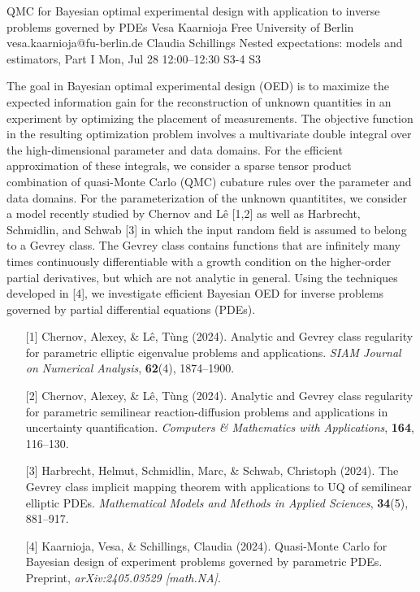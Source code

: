 \begin{talk}
  {QMC for Bayesian optimal experimental design with application to inverse problems governed by PDEs}%
  {Vesa Kaarnioja}%
  {Free University of Berlin}%
  {vesa.kaarnioja@fu-berlin.de}%
  {Claudia Schillings}%
  {Nested expectations: models and estimators, Part I}%
  {Mon, Jul 28 12:00–12:30}%
  {S3-4}%
  {S3}%
				
			
The goal in Bayesian optimal experimental design (OED) is to maximize the expected information gain for the reconstruction of unknown quantities in an experiment by optimizing the placement of measurements. The objective function in the resulting optimization problem involves a multivariate double integral over the high-dimensional parameter and data domains. For the efficient approximation of these integrals, we consider a sparse tensor product combination of quasi-Monte Carlo (QMC) cubature rules over the parameter and data domains. For the parameterization of the unknown quantitites, we consider a model recently studied by Chernov and L\^{e} [1,2] as well as Harbrecht, Schmidlin, and Schwab [3] in which the input random field is assumed to belong to a Gevrey class. The Gevrey class contains functions that are infinitely many times continuously differentiable with a growth condition on the higher-order partial derivatives, but which are not analytic in general. Using the techniques developed in [4], we investigate efficient Bayesian OED for inverse problems governed by partial differential equations (PDEs).
\begin{enumerate}
	\item[{[1]}] Chernov, Alexey, \& L\^{e}, T\`{u}ng (2024). Analytic and Gevrey class regularity for parametric elliptic eigenvalue problems and applications. \emph{SIAM Journal on Numerical Analysis}, \textbf{62}(4), 1874--1900.
	\item[{[2]}] Chernov, Alexey, \& L\^{e}, T\`{u}ng (2024). Analytic and Gevrey class regularity for parametric semilinear reaction-diffusion problems and applications in uncertainty quantification. \emph{Computers \& Mathematics with Applications}, \textbf{164}, 116--130.
	\item[{[3]}] Harbrecht, Helmut, Schmidlin, Marc, \& Schwab, Christoph (2024). The Gevrey class implicit mapping theorem with applications to UQ of semilinear elliptic PDEs. \emph{Mathematical Models and Methods in Applied Sciences}, \textbf{34}(5), 881--917.
	\item[{[4]}] Kaarnioja, Vesa, \& Schillings, Claudia (2024). Quasi-Monte Carlo for Bayesian design of experiment problems governed by parametric PDEs. Preprint, \emph{arXiv:2405.03529 [math.NA]}.
\end{enumerate}

\end{talk}

